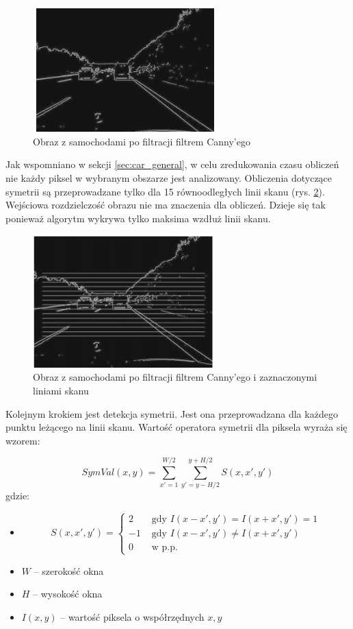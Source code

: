 \begin{figure}
  \centering
  \includegraphics[width=7cm]{img/car_canny.png}
  \caption{Obraz z samochodami po filtracji filtrem Canny'ego\cite{T1}}
  \label{fig:car_edge}
\end{figure}

Jak wspomniano w sekcji \ref{sec:car_general}, w celu zredukowania czasu obliczeń nie każdy piksel w wybranym obszarze jest analizowany. 
Obliczenia dotyczące symetrii są przeprowadzane tylko dla 15 równoodległych linii skanu (rys. \ref{fig:car_scan_lines1}). 
Wejściowa rozdzielczość obrazu nie ma znaczenia dla obliczeń. %
Dzieje się tak ponieważ algorytm wykrywa tylko maksima wzdłuż linii skanu.

\begin{figure}
  \centering
  \includegraphics[width=7cm]{img/car_lines.png}
  \caption{Obraz z samochodami po filtracji filtrem Canny'ego i zaznaczonymi liniami skanu\cite{T1}}
  \label{fig:car_scan_lines1}
\end{figure}

Kolejnym krokiem jest detekcja symetrii. 
Jest ona przeprowadzana dla każdego punktu leżącego na linii skanu.
Wartość operatora symetrii dla piksela wyraża się wzorem:

\begin{equation}
SymVal(x,y)=\sum_{x'=1}^{W/2}\sum_{y'=y-H/2}^{y+H/2}S(x, x', y')
\end{equation}
gdzie:
\begin{itemize}
\item
\begin{equation}
S(x,x',y')=\begin{cases}
2 & \text{ gdy } I(x-x',y')=I(x+x',y')=1 \\ 
-1 & \text{ gdy } I(x-x',y')\neq I(x+x',y') \\ 
0 & \text{ w p.p. }
\end{cases}
\end{equation}
\item $W$ -- szerokość okna
\item $H$ -- wysokość okna
\item $I(x,y)$ -- wartość piksela o współrzędnych $x,y$
\end{itemize}

